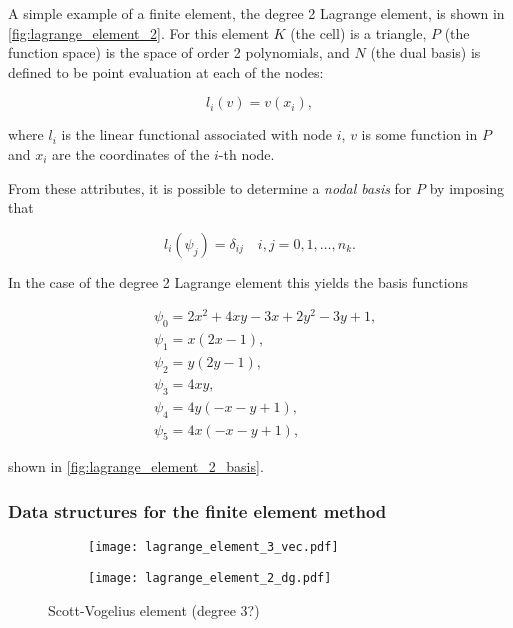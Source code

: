 \documentclass[thesis]{subfiles}
\begin{document}
A simple example of a finite element, the degree 2 Lagrange element, is shown in \cref{fig:lagrange_element_2}.
For this element $K$ (the cell) is a triangle, $P$ (the function space) is the space of order 2 polynomials, and $N$ (the dual basis) is defined to be point evaluation at each of the nodes:

\begin{equation*}
  l_i(v) = v(x_i),
\end{equation*}

where $l_i$ is the linear functional associated with node $i$, $v$ is some function in $P$ and $x_i$ are the coordinates of the $i$-th node.

From these attributes, it is possible to determine a \textit{nodal basis} for $P$ by imposing that

\begin{equation*}
  l_i(\psi_j) = \delta_{ij} \quad i, j = 0, 1, \dots, n_k.
\end{equation*}

In the case of the degree 2 Lagrange element this yields the basis functions

\begin{align*}
  &\psi_0 = 2x^2 + 4xy - 3x + 2y^2-3y+1, \\
  &\psi_1 = x(2x-1), \\
  &\psi_2 = y(2y-1), \\
  &\psi_3 = 4xy, \\
  &\psi_4 = 4y(-x-y+1), \\
  &\psi_5 = 4x(-x-y+1),
\end{align*}

shown in \cref{fig:lagrange_element_2_basis}.

\subsubsection{Data structures for the finite element method}

\begin{figure}
  \centering
  \hfill
  \begin{subfigure}{.4\textwidth}
    \texttt{[image: lagrange\_element\_3\_vec.pdf]}
  \end{subfigure}
  \hfill
  \begin{subfigure}{.4\textwidth}
    \texttt{[image: lagrange\_element\_2\_dg.pdf]}
  \end{subfigure}
  \hfill
  \caption{Scott-Vogelius element (degree 3?)}
  \label{fig:scott_vogelius_element}
\end{figure}
\end{document}
